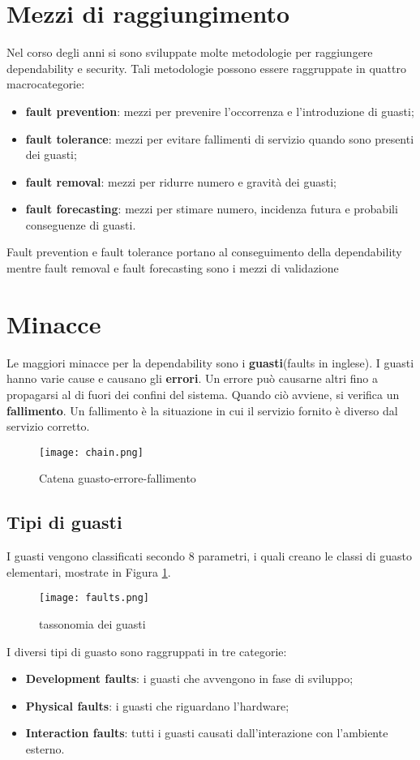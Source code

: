 \section{Mezzi di raggiungimento}
Nel corso degli anni si sono sviluppate molte metodologie per raggiungere dependability e security. Tali metodologie possono essere raggruppate in quattro macrocategorie:
\begin{itemize}
    \item \textbf{fault prevention}: mezzi per prevenire l'occorrenza e l'introduzione di guasti;
    \item \textbf{fault tolerance}: mezzi per evitare fallimenti di servizio quando sono presenti dei guasti;
    \item \textbf{fault removal}: mezzi per ridurre numero e gravità dei guasti;
    \item \textbf{fault forecasting}: mezzi per stimare numero, incidenza futura e probabili conseguenze di guasti.
\end{itemize}
Fault prevention e fault tolerance portano al conseguimento della dependability mentre fault removal e fault forecasting sono i mezzi di validazione
\section{Minacce}
Le maggiori minacce per la dependability sono i \textbf{guasti}(faults in inglese). I guasti hanno varie cause e causano gli \textbf{errori}. Un errore può causarne altri fino a propagarsi
al di fuori dei confini del sistema. Quando ciò avviene, si verifica un \textbf{fallimento}. Un fallimento è la situazione in cui il servizio fornito
è diverso dal servizio corretto.
\begin{figure}[h]
    \texttt{[image: chain.png]}
    \caption{Catena guasto-errore-fallimento}
\end{figure}
\subsection{Tipi di guasti}
I guasti vengono classificati secondo 8 parametri, i quali creano le classi di guasto elementari, mostrate in Figura \ref{fig:tax}.
\begin{figure}[h]
    \texttt{[image: faults.png]}
    \caption{tassonomia dei guasti\cite{tax}}
    \label{fig:tax}
\end{figure}
 I diversi tipi di guasto sono raggruppati in tre categorie:
 \begin{itemize}
     \item \textbf{Development faults}: i guasti che avvengono in fase di sviluppo;
     \item \textbf{Physical faults}: i guasti che riguardano l'hardware;
     \item \textbf{Interaction faults}: tutti i guasti causati dall'interazione con l'ambiente esterno.
 \end{itemize}
 \newpage
